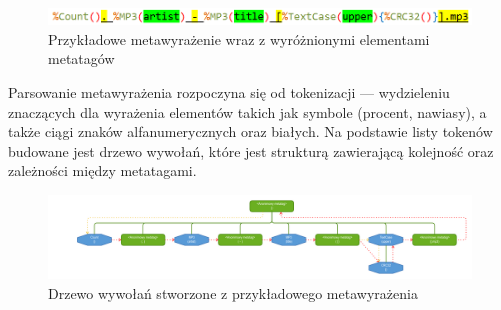 \begin{figure}[h]
\begin{center}
\includegraphics[scale=0.55]{img/metatag_expr2.png}
\end{center}
\caption{Przykładowe metawyrażenie wraz z wyróżnionymi elementami metatagów}
\label{metatag-expr}
\end{figure}

\par
Parsowanie metawyrażenia rozpoczyna się od tokenizacji --- wydzieleniu znaczących dla wyrażenia elementów takich jak symbole (procent, nawiasy), a także ciągi znaków alfanumerycznych oraz białych. Na podstawie listy tokenów budowane jest drzewo wywołań, które jest strukturą zawierającą kolejność oraz zależności między metatagami.

\begin{figure}
\begin{center}
\includegraphics[scale=0.6]{img/metatag_expr_tree4.png}
\end{center}
\caption{Drzewo wywołań stworzone z przykładowego metawyrażenia}
\label{metatag-expr-tree}
\end{figure}


